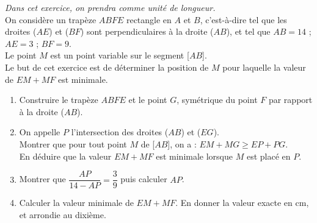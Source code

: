 \bigskip


\begin{exercice}[CRPE 2015 G1] %
   {\it Dans cet exercice, on prendra  comme unité de longueur.} \\ [5mm]
   On considère un trapèze $ABFE$ rectangle en $A$ et $B$, c'est-à-dire tel que les droites ($AE$) et ($BF$) sont perpendiculaires à la droite ($AB$), et tel que $AB = 14$ ; $AE = 3$ ; $BF = 9$. \\
   Le point $M$ est un point variable sur le segment [$AB$]. \\
   Le but de cet exercice est de déterminer la position de $M$ pour laquelle la valeur de $EM+MF$ est minimale.
   \begin{enumerate}
      \item Construire le trapèze $ABFE$ et le point $G$, symétrique du point $F$ par rapport à la droite ($AB$).
      \item On appelle $P$ l'intersection des droites ($AB$) et ($EG$). \\
   Montrer que pour tout point $M$ de [$AB$], on a : $EM+MG\geqslant EP+PG$. \\
         En déduire que la valeur $EM+MF$ est minimale lorsque $M$ est placé en $P$.
      \item Montrer que $\dfrac{AP}{14-AP} =\dfrac39$ puis calculer $AP$. \smallskip
      \item Calculer la valeur minimale de $EM+MF$. En donner la valeur exacte en cm, et arrondie au dixième.
   \end{enumerate}
\end{exercice}

